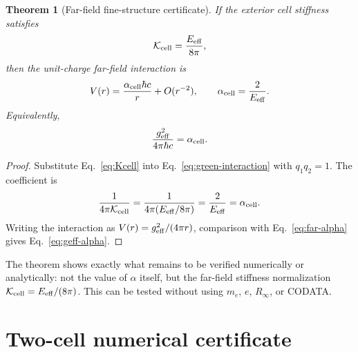 \documentclass[11pt]{article}
\newcommand{\Eeff}{E_{\rm eff}}
\newcommand{\alphacell}{\alpha_{\rm cell}}
\newcommand{\Kcell}{\mathcal K_{\rm cell}}
\newtheorem{theorem}{Theorem}
\begin{document}
\begin{theorem}[Far-field fine-structure certificate]
\label{thm:farfield}
If the exterior cell stiffness satisfies
\begin{equation}
\Kcell=\frac{\Eeff}{8\pi},
\label{eq:Kcell}
\end{equation}
then the unit-charge far-field interaction is
\begin{equation}
V(r)=\frac{\alphacell\hbar c}{r}+O(r^{-2}),
\qquad
\alphacell=\frac{2}{\Eeff}.
\label{eq:far-alpha}
\end{equation}
Equivalently,
\begin{equation}
\frac{g_{\rm eff}^2}{4\pi\hbar c}=\alphacell.
\label{eq:geff-alpha}
\end{equation}
\end{theorem}

\begin{proof}
Substitute Eq.~\eqref{eq:Kcell} into Eq.~\eqref{eq:green-interaction} with \(q_1q_2=1\). The coefficient is
\begin{equation}
\frac{1}{4\pi\Kcell}
=
\frac{1}{4\pi(\Eeff/8\pi)}
=
\frac{2}{\Eeff}
=\alphacell.
\end{equation}
Writing the interaction as \(V(r)=g_{\rm eff}^2/(4\pi r)\), comparison with Eq.~\eqref{eq:far-alpha} gives Eq.~\eqref{eq:geff-alpha}.
\end{proof}

The theorem shows exactly what remains to be verified numerically or analytically: not the value of \(\alpha\) itself, but the far-field stiffness normalization \(\Kcell=\Eeff/(8\pi)\). This can be tested without using \(m_e\), \(e\), \(R_\infty\), or CODATA.

\section{Two-cell numerical certificate}
\label{sec:twocell}
\end{document}
